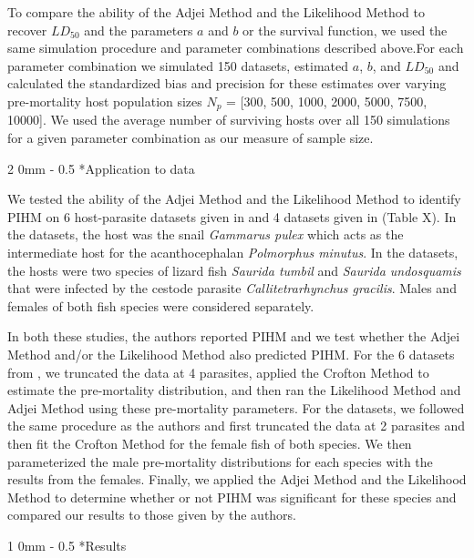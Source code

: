 \documentclass[12pt, a4paper]{article}
\makeatletter
\renewcommand{\section}{\@startsection
{section}%
{1}%
{0mm}%
{-\baselineskip}%
{0.5\baselineskip}%
{\normalfont\bf\large}} %
\renewcommand{\subsection}{\@startsection
{subsection}%
{2}%
{0mm}%
{-\baselineskip}%
{0.5\baselineskip}%
{\normalfont\bf}} %
\makeatother
\begin{document}
To compare the ability of the Adjei Method and the Likelihood Method to recover $LD_{50}$ and the parameters $a$ and $b$ or the survival function, we used the same simulation procedure and parameter combinations described above.For each parameter
combination we simulated 150 datasets, estimated $a$, $b$, and $LD_{50}$ and calculated the standardized bias and
precision \citep{Walther2005} for these estimates over varying pre-mortality host population sizes  $N_p$ = [300, 500, 1000, 2000, 5000, 7500,
10000]. We used the average number of surviving hosts over all 150 simulations for a given parameter combination as our measure of sample size.

\subsection*{Application to data}

We tested the ability of the Adjei Method and the Likelihood Method to identify
PIHM on 6 host-parasite datasets given in \cite{Crofton1971a} and 4 datasets
given in \cite{Adjei1986} (Table X). In the \cite{Crofton1971a} datasets, the host was
the snail \emph{Gammarus pulex} which acts as the intermediate host for the
acanthocephalan \emph{Polmorphus minutus}. In the \cite{Adjei1986} datasets,
the hosts were two species of lizard fish \emph{Saurida tumbil} and
\emph{Saurida undosquamis} that were infected by the cestode parasite
\emph{Callitetrarhynchus gracilis}.  Males and females of both fish species
were considered separately.

In both these studies, the authors reported PIHM and we test whether the Adjei
Method and/or the Likelihood Method also predicted PIHM. For the 6 datasets from
\cite{Crofton1971a}, we truncated the data at 4 parasites, applied the Crofton
Method to estimate the pre-mortality distribution, and then ran the Likelihood
Method and Adjei Method using these pre-mortality parameters.  For the
\cite{Adjei1986} datasets, we followed the same procedure as the authors and
first truncated the data at 2 parasites and then fit the Crofton Method for the
female fish of both species.  We then parameterized the male pre-mortality
distributions for each species with the results from the females.  Finally, we
applied the Adjei Method and the Likelihood Method to determine whether or not
PIHM was significant for these species and compared our results to those given by the authors.

\section*{Results}
\end{document}
